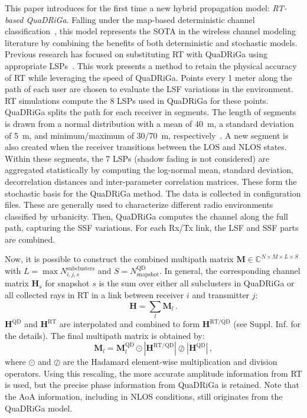 \documentclass{IEEEtran}
\begin{document}
This paper introduces for the first time a new hybrid propagation model: \textit{\gls{RT}-based \gls{QuaDRiGa}}. Falling under the map-based deterministic channel classification~\cite{channelgensurver}, this model represents the \gls{SOTA} in the wireless channel modeling literature by combining the benefits of both deterministic and stochastic models. Previous research has focused on substituting \gls{RT} with \gls{QuaDRiGa} using appropriate \glspl{LSP}~\cite{RT-based-QD}. This work presents a method to retain the physical accuracy of \gls{RT} while leveraging the speed of \gls{QuaDRiGa}. Points every 1 meter along the path of each user are chosen to evaluate the \gls{LSF} variations in the environment. \gls{RT} simulations compute the 8 \glspl{LSP} used in \gls{QuaDRiGa} \cite{QDv2} for these points. \gls{QuaDRiGa} splits the path for each receiver in segments. The length of segments is drawn from a normal distribution with a mean of 40~m, a standard deviation of 5~m, and minimum/maximum of 30/70~m, respectively~\cite{mmMAGIC}. A new segment is also created when the receiver transitions between the \gls{LOS} and \gls{NLOS} states. Within these segments, the 7 \glspl{LSP} (shadow fading is not considered) are aggregated statistically by computing the log-normal mean, standard deviation, decorrelation distances and inter-parameter correlation matrices. These form the stochastic basis for the \gls{QuaDRiGa} method. The data is collected in configuration files. These are generally used to characterize different radio environments classified by urbanicity. Then, \gls{QuaDRiGa} computes the channel along the full path, capturing the \gls{SSF} variations. For each Rx/Tx link, the \gls{LSF} and \gls{SSF} parts are combined. 

Now, it is possible to construct the combined multipath matrix $\mathbf{M} \in \mathbb{C}^{N\times M \times L \times S}$ with $L = \max N_{i,j,s}^\mathrm{subclusters}$ and $S = N^\mathrm{QD}_\mathrm{snapshot}$. In general, the corresponding channel matrix $\textbf{H}_s$ for snapshot $s$ is the sum over either all subclusters in \gls{QuaDRiGa} or all collected rays in \gls{RT} in a link between receiver $i$ and transmitter $j$:
\begin{equation}
\label{eq:c_to_g}
\textbf{H} = \sum_{l} \textbf{M}_{l} \, .
\end{equation}
$\mathbf{H}^\mathrm{QD}$ and $\mathbf{H}^\mathrm{RT}$ are interpolated and combined to form $\mathbf{H}^\mathrm{RT/QD}$ (see Suppl. Inf. for the details). 
The final multipath matrix is obtained by:
\begin{equation}
\label{eq:final_channel}
\mathbf{M}_l = \mathbf{M}_l^\mathrm{QD} \odot |  \mathbf{H}^\mathrm{RT/QD} | \oslash | \mathbf{H}^\mathrm{QD} | \, ,
\end{equation}
where $\odot$ and $\oslash$ are the Hadamard element-wise multiplication and division operators. Using this rescaling, the more accurate amplitude information from \gls{RT} is used, but the precise phase information from \gls{QuaDRiGa} is retained. Note that the \gls{AoA} information, including in \gls{NLOS} conditions, still originates from the \gls{QuaDRiGa} model.
\end{document}
